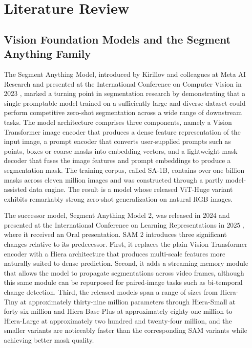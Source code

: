 \documentclass[11pt,a4paper,oneside]{report}
\begin{document}
\chapter{Literature Review}
\label{chap:litreview}

\section{Vision Foundation Models and the Segment Anything Family}

The Segment Anything Model, introduced by Kirillov and colleagues at Meta AI Research and presented at the International Conference on Computer Vision in 2023 \cite{Kirillov2023SAM}, marked a turning point in segmentation research by demonstrating that a single promptable model trained on a sufficiently large and diverse dataset could perform competitive zero-shot segmentation across a wide range of downstream tasks. The model architecture comprises three components, namely a Vision Transformer image encoder that produces a dense feature representation of the input image, a prompt encoder that converts user-supplied prompts such as points, boxes or coarse masks into embedding vectors, and a lightweight mask decoder that fuses the image features and prompt embeddings to produce a segmentation mask. The training corpus, called SA-1B, contains over one billion masks across eleven million images and was constructed through a partly model-assisted data engine. The result is a model whose released ViT-Huge variant exhibits remarkably strong zero-shot generalization on natural RGB images.

The successor model, Segment Anything Model 2, was released in 2024 and presented at the International Conference on Learning Representations in 2025 \cite{Ravi2025SAM2}, where it received an Oral presentation. SAM 2 introduces three significant changes relative to its predecessor. First, it replaces the plain Vision Transformer encoder with a Hiera architecture that produces multi-scale features more naturally suited to dense prediction. Second, it adds a streaming memory module that allows the model to propagate segmentations across video frames, although this same module can be repurposed for paired-image tasks such as bi-temporal change detection. Third, the released models span a range of sizes from Hiera-Tiny at approximately thirty-nine million parameters through Hiera-Small at forty-six million and Hiera-Base-Plus at approximately eighty-one million to Hiera-Large at approximately two hundred and twenty-four million, and the smaller variants are noticeably faster than the corresponding SAM variants while achieving better mask quality.
\end{document}
